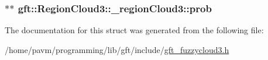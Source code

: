 \hypertarget{structgft_1_1RegionCloud3_1_1__regionCloud3_a80d4c38584c9d6d720c721ebd4d13b06}{
\subsubsection[{prob}]{$\ast$$\ast$ gft\-::\-Region\-Cloud3\-::\-\_\-region\-Cloud3\-::prob}}\label{structgft_1_1RegionCloud3_1_1__regionCloud3_a80d4c38584c9d6d720c721ebd4d13b06}


The documentation for this struct was generated from the following file\-:\begin{DoxyCompactItemize}
\item 
/home/pavm/programming/lib/gft/include/\hyperlink{gft__fuzzycloud3_8h}{gft\-\_\-fuzzycloud3.\-h}\end{DoxyCompactItemize}
